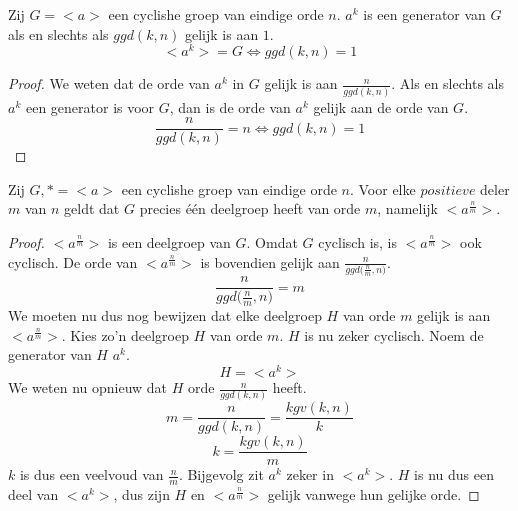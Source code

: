 \documentclass[main.tex]{subfiles}
\begin{document}
\begin{st}
  Zij $G = <a>$ een cyclishe groep van eindige orde $n$.
  $a^{k}$ is een generator van $G$ als en slechts als $ggd(k,n)$ gelijk is aan $1$.
  \[ <a^{k}> = G \Leftrightarrow ggd(k,n) = 1 \]

  \begin{proof}
     We weten dat de orde van $a^{k}$ in $G$ gelijk is aan $\frac{n}{ggd(k,n)}$.
     Als en slechts als $a^{k}$ een generator is voor $G$, dan is de orde van $a^{k}$ gelijk aan de orde van $G$.
     \[ \frac{n}{ggd(k,n)} = n \Leftrightarrow ggd(k,n) = 1 \]
  \end{proof}
\end{st}

\begin{st}
  Zij $G,* = <a>$ een cyclishe groep van eindige orde $n$.
  Voor elke $positieve$ deler $m$ van $n$ geldt dat $G$ precies \'e\'en deelgroep heeft van orde $m$, namelijk $<a^{\frac{n}{m}}>$.
  \begin{proof}
    $<a^{\frac{n}{m}}>$ is een deelgroep van $G$.
    Omdat $G$ cyclisch is, is $<a^{\frac{n}{m}}>$ ook cyclisch. De orde van $<a^{\frac{n}{m}}>$ is bovendien gelijk aan $\frac{n}{ggd({\frac{n}{m},n)}}$.
    \[ \frac{n}{ggd({\frac{n}{m},n)}} = m \]
    We moeten nu dus nog bewijzen dat elke deelgroep $H$ van orde $m$ gelijk is aan $<a^{\frac{n}{m}}>$.
    Kies zo'n deelgroep $H$ van orde $m$. $H$ is nu zeker cyclisch.
    Noem de generator van $H$ $a^{k}$.
    \[ H = <a^{k}> \]
    We weten nu opnieuw dat $H$ orde $\frac{n}{ggd(k,n)}$ heeft.
    \[ m = \frac{n}{ggd(k,n)} = \frac{kgv(k,n)}{k} \]
    \[ k = \frac{kgv(k,n)}{m} \]
    $k$ is dus een veelvoud van $\frac{n}{m}$.
    Bijgevolg zit $a^{k}$ zeker in $<a^{k}>$.
    $H$ is nu dus een deel van $<a^{k}>$, dus zijn $H$ en $<a^{\frac{n}{m}}>$ gelijk vanwege hun gelijke orde.
  \end{proof}
\end{st}
\end{document}
